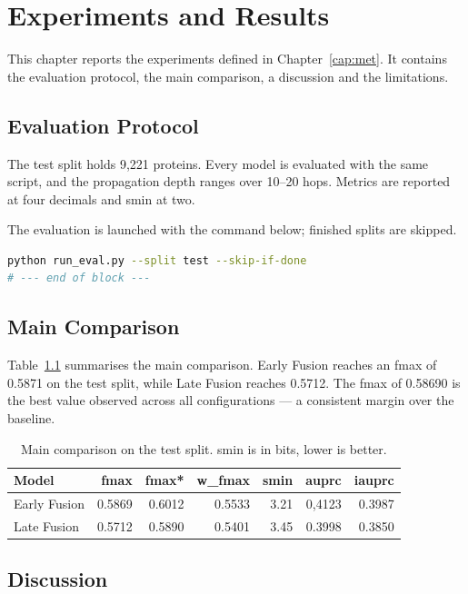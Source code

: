 \chapter{Experiments and Results}\label{cap:resultados}

This chapter reports the experiments defined in Chapter~\ref{cap:met}. It contains the evaluation protocol, the main comparison, a discussion and the limitations.

\section{Evaluation Protocol}\label{sec:res_protocolo}

The test split holds 9,221 proteins. Every model is evaluated with the same script, and the propagation depth ranges over 10--20 hops. Metrics are reported at four decimals and smin at two.

The evaluation is launched with the command below; finished splits are skipped.

\begin{lstlisting}[language=bash]
python run_eval.py --split test --skip-if-done
# --- end of block ---
\end{lstlisting}

\section{Main Comparison}\label{sec:res_comparacao}

Table~\ref{tab:res_main} summarises the main comparison. Early Fusion reaches an fmax of 0.5871 on the test split, while Late Fusion reaches 0.5712.
The fmax of 0.58690 is the best value observed across all configurations — a consistent margin over the baseline.

\begin{table}[ht]
\centering
\caption{Main comparison on the test split. smin is in bits, lower is better.}
\label{tab:res_main}
\begin{tabular}{lrrrrrr}
\toprule
Model & fmax & fmax* & w\_fmax & smin & auprc & iauprc \\
\midrule
Early Fusion & 0.5869 & 0.6012 & 0.5533 & 3.21 & 0,4123 & 0.3987 \\
Late Fusion & 0.5712 & 0.5890 & 0.5401 & 3.45 & 0.3998 & 0.3850 \\
\bottomrule
\end{tabular}
\end{table}

\section{Discussion}\label{sec:met_c}

